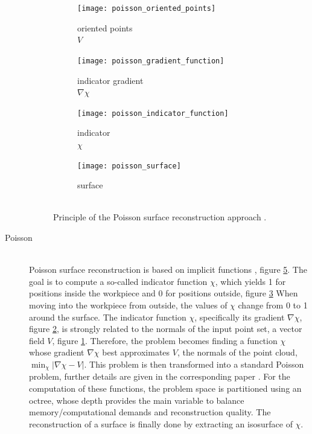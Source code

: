 \begin{description}
	\begin{figure}
		\centering
		\begin{subfigure}[b]{0.24\textwidth}
			\centering
			\texttt{[image: poisson\_oriented\_points]}
			\captionsetup{justification=centering}
			\caption{
				oriented points\\
				$V$
			}
			\label{fig:poisson_oriented_points}
		\end{subfigure}
		\begin{subfigure}[b]{0.24\textwidth}
			\centering
			\texttt{[image: poisson\_gradient\_function]}
			\captionsetup{justification=centering}
			\caption{
				indicator gradient\\
				$\nabla\chi$
			}
			\label{fig:poisson_gradient_function}
		\end{subfigure}
		\begin{subfigure}[b]{0.24\textwidth}
			\centering
			\texttt{[image: poisson\_indicator\_function]}
			\captionsetup{justification=centering}
			\caption{
				indicator\\
				$\chi$
			}
			\label{fig:poisson_indicator_function}
		\end{subfigure}
		\begin{subfigure}[b]{0.24\textwidth}
			\centering
			\texttt{[image: poisson\_surface]}
			\captionsetup{justification=centering}
			\caption{
				surface\\
				~
			}
			\label{fig:poisson_surface}
		\end{subfigure}
		\caption{
			Principle of the Poisson surface reconstruction approach \cite{poisson}.
		}
		\label{fig:poisson_principle}
	\end{figure}

	\item[Poisson] \hfill \\
	Poisson surface reconstruction is based on implicit functions \cite{poisson}, \cf figure \ref{fig:poisson_principle}.
	The goal is to compute a so-called indicator function $\chi$, which yields 1 for positions inside the workpiece and 0 for positions outside, \cf figure \ref{fig:poisson_indicator_function}
	When moving into the workpiece from outside, the values of $\chi$ change from 0 to 1 around the surface.
	The indicator function $\chi$, specifically its gradient $\nabla\chi$, \cf figure \ref{fig:poisson_gradient_function}, is strongly related to the normals of the input point set, a vector field $V$, \cf figure \ref{fig:poisson_oriented_points}.
	Therefore, the problem becomes finding a function $\chi$ whose gradient $\nabla\chi$ best approximates $V$, the normals of the point cloud, \ie $\min_\chi |\nabla\chi - V|$.
	This problem is then transformed into a standard Poisson problem, further details are given in the corresponding paper \cite{poisson}.
	For the computation of these functions, the problem space is partitioned using an octree, whose depth provides the main variable to balance memory/computational demands and reconstruction quality.
	The reconstruction of a surface is finally done by extracting an isosurface of $\chi$.


\end{description}
